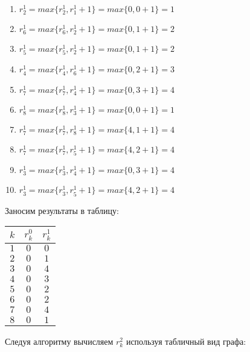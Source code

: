 \begin{enumerate}[nosep]
	\item $r_2^1 = max\{r_2^1, r_1^1 + 1\} = max\{0,0+1\} = 1$
	\item $r_6^1 = max\{r_6^1, r_2^1 + 1\} = max\{0,1+1\} = 2$
	\item $r_5^1 = max\{r_5^1, r_2^1 + 1\} = max\{0,1+1\} = 2$
	\item $r_4^1 = max\{r_4^1, r_6^1 + 1\} = max\{0,2+1\} = 3$
	\item $r_7^1 = max\{r_7^1, r_4^1 + 1\} = max\{0,3+1\} = 4$
	\item $r_8^1 = max\{r_8^1, r_3^1 + 1\} = max\{0,0+1\} = 1$
	\item $r_7^1 = max\{r_7^1, r_8^1 + 1\} = max\{4,1+1\} = 4$
	\item $r_7^1 = max\{r_7^1, r_5^1 + 1\} = max\{4,2+1\} = 4$
	\item $r_3^1 = max\{r_3^1, r_4^1 + 1\} = max\{0,3+1\} = 4$
	\item $r_3^1 = max\{r_3^1, r_5^1 + 1\} = max\{4,2+1\} = 4$
\end{enumerate}

Заносим результаты в таблицу:


\begin{table}[H]
	\centering
	\begin{tabular}{ | c | c | c | } 
		\hline
		$k$ & $r_k^0$ & $r_k^1$ \\ \hline
		$1$ & $0$ & $0$ \\ \hline
		$2$ & $0$ & $1$ \\ \hline
		$3$ & $0$ & $4$ \\ \hline
		$4$ & $0$ & $3$ \\ \hline
		$5$ & $0$ & $2$ \\ \hline
		$6$ & $0$ & $2$ \\ \hline
		$7$ & $0$ & $4$ \\ \hline
		$8$ & $0$ & $1$ \\ \hline
	\end{tabular}
\end{table}

\bigskip


\bigskip

Следуя алгоритму вычисляем $r^2_k$ используя табличный вид графа:

